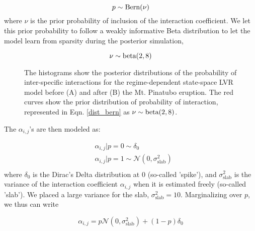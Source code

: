 \documentclass[11pt]{article}
\begin{document}
\begin{equation}\label{dist_bern}
	p \sim \textnormal{Bern}(\nu)
\end{equation}
where $\nu$ is the prior probability of inclusion of the interaction coefficient. We let this prior probability to follow a weakly informative Beta distribution to let the model learn from sparsity during the posterior simulation,

\begin{equation}\label{dist_beta}
	\nu \sim \textnormal{beta}(2,8)
\end{equation}

\renewcommand{\thefigure}{S1}
\begin{figure}[t]
	\centering
	\qquad
	\caption{The histograms show the posterior distributions of the probability of inter-specific interactions for the regime-dependent state-space LVR model before (A) and after (B) the Mt. Pinatubo eruption. The red curves show the prior distribution of probability of interaction, represented in Eqn. \ref{dist_bern} as $ \nu \sim \textnormal{beta}(2,8)$. }
	\label{fig:PriorPosSSVS}%
\end{figure}

The $\alpha_{i,j}$'s are then modeled as:

\begin{equation}\label{Spike_and_slab}
	\begin{aligned}
		&\alpha_{i,j} | p = 0 \sim \delta_{0} \\
		&\alpha_{i,j} | p = 1 \sim \mathcal{N}\left(0, \sigma^2_{\text{slab}} \right) \\
	\end{aligned}
\end{equation}
where $\delta_{0}$ is the Dirac's Delta distribution at 0 (so-called 'spike'), and $\sigma^2_{\text{slab}}$ is the variance of the interaction coefficient $\alpha_{i,j}$ when it is estimated freely (so-called 'slab'). We placed a large variance for the slab, $\sigma^2_{\text{slab}} = 10 $. Marginalizing over $p$, we thus can write

\begin{equation}\label{MargSaS}
	\alpha_{i,j} = p \mathcal{N}(0, \sigma^2_{\text{slab}}) + (1 - p) \delta_{0}
\end{equation}
\end{document}
